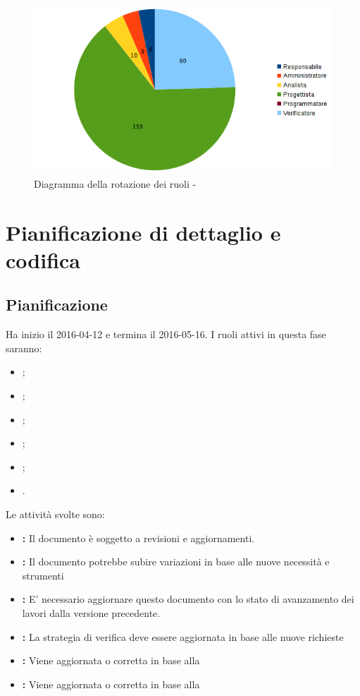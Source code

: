 \documentclass[12pt,a4paper]{article}
\begin{document}
\begin{center}
	\begin{figure}[H]
		\centering		\includegraphics[width=\textwidth]{diagrammaTortaProgettazioneArchitetturaleTotaleOre.png}
		\caption{Diagramma della rotazione dei ruoli - \FPA}
	\end{figure}
\end{center}

\newpage
\section{Pianificazione di dettaglio e codifica} %

\subsection{Pianificazione}

Ha inizio il 2016-04-12 e termina il 2016-05-16. 
I ruoli attivi in questa fase saranno:
\begin{itemize}
\item \PM;
\item \AM;
\item \AN;
\item \PR;
\item \PG;
\item \VR.
\end{itemize}

Le attività svolte sono:
\begin{itemize}
	\item \textbf{\AdR:} 
	Il documento è soggetto a revisioni e aggiornamenti.
	\item \textbf{\NdP:}
	Il documento potrebbe subire variazioni in base
	alle nuove necessità e strumenti
	\item \textbf{\PdP:}
	E' necessario aggiornare questo documento con lo stato di avanzamento
	dei lavori dalla versione precedente.
	\item \textbf{\PdQ:}
	La strategia di verifica deve essere aggiornata in base 
	alle nuove richieste
	\item \textbf{\ST:}
	Viene aggiornata o corretta in base alla \RP
	\item \textbf{\DP:} 
	Viene aggiornata o corretta in base alla \RP
\end{itemize}
\end{document}
